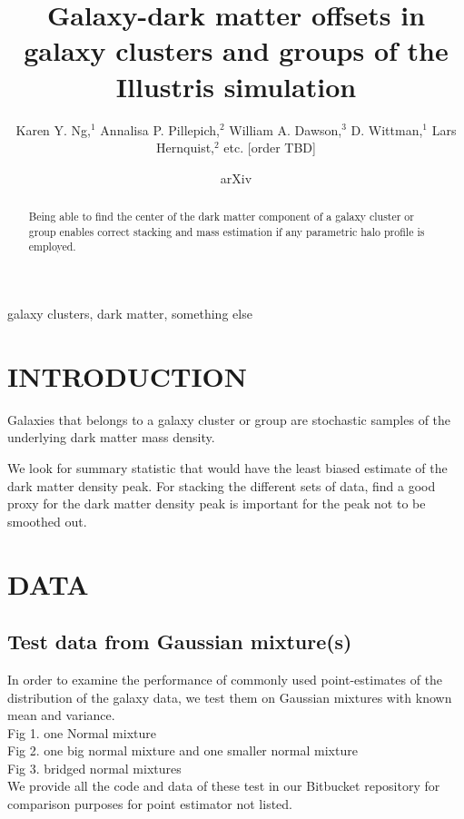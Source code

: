 \documentclass[letterpaper,useAMS,usenatbib]{mn2e}
\title[
	Galaxy-dark matter offsets in galaxy clusters and groups of the
Illustris simulation
]
{Galaxy-dark matter offsets in galaxy clusters and groups of the
Illustris simulation}
\author[Karen Y. Ng et al.]{Karen Y. Ng,$^{1}$
	Annalisa P. Pillepich,$^{2}$ 
	William A. Dawson,$^{3}$ 
	D. Wittman,$^{1}$
	\newauthor Lars Hernquist,$^{2}$
	etc. [order TBD]
}
\begin{document}
\date{arXiv} \pagerange{\pageref{firstpage}--\pageref{lastpage}}
 \maketitle\label{firstpage}
\begin{abstract} 
	Being able to find the center of the dark matter component of a galaxy cluster or
	group enables correct stacking and mass estimation if any parametric halo
	profile is employed. 
\end{abstract}
\begin{keywords}
	galaxy clusters, dark matter, something else 
\end{keywords}
\section{INTRODUCTION} 

Galaxies that belongs to a galaxy cluster or group are stochastic samples
of the underlying dark matter mass density. 

We look for summary statistic that would have the least biased estimate of
the dark matter density peak. For stacking the different sets of data, 
find a good proxy for the dark matter density peak is important for the
peak not to be smoothed out. 


\section{DATA}
\subsection{Test data from Gaussian mixture(s)}
In order to examine the performance of commonly used point-estimates of the
distribution of the galaxy data, we test them on Gaussian mixtures with
known mean and variance. \\
Fig 1. one Normal mixture \\  
Fig 2. one big normal mixture and one smaller normal mixture \\ 
Fig 3. bridged normal mixtures \\  

We provide all the code and data of these test in our Bitbucket repository
for comparison purposes for point estimator not listed.
\end{document}
